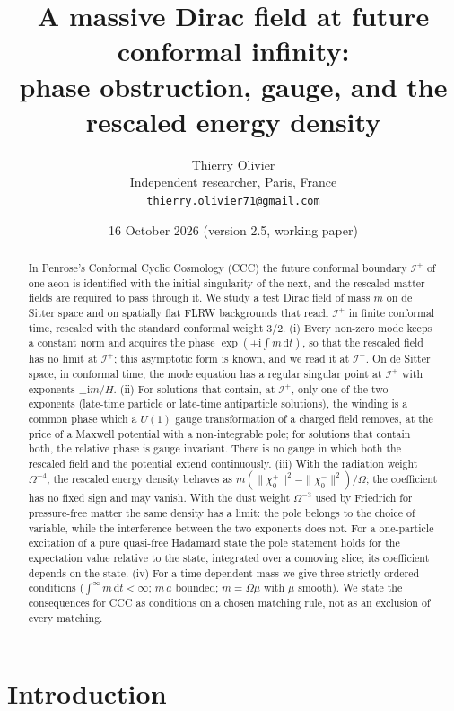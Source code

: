 \documentclass[11pt,a4paper]{article}
\title{\textbf{A massive Dirac field at future conformal infinity:\\ phase obstruction, gauge, and the rescaled energy density}}
\author{Thierry Olivier\\ \small Independent researcher, Paris, France\\ \small \texttt{thierry.olivier71@gmail.com}}
\date{16 October 2026 \quad (version 2.5, working paper)}
\theoremstyle{definition}
\newcommand{\scri}{\mathscr{I}^{+}}
\newcommand{\dd}{\mathrm{d}}
\newcommand{\ii}{\mathrm{i}}
\begin{document}
\maketitle

\begin{abstract}
In Penrose's Conformal Cyclic Cosmology (CCC) the future conformal boundary $\scri$ of one aeon is identified with the initial singularity of the next, and the rescaled matter fields are required to pass through it. We study a test Dirac field of mass $m$ on de Sitter space and on spatially flat FLRW backgrounds that reach $\scri$ in finite conformal time, rescaled with the standard conformal weight $3/2$. (i) Every non-zero mode keeps a constant norm and acquires the phase $\exp(\pm\ii\int m\,\dd t)$, so that the rescaled field has no limit at $\scri$; this asymptotic form is known, and we read it at $\scri$. On de Sitter space, in conformal time, the mode equation has a regular singular point at $\scri$ with exponents $\pm\ii m/H$. (ii) For solutions that contain, at $\scri$, only one of the two exponents (late-time particle or late-time antiparticle solutions), the winding is a common phase which a $U(1)$ gauge transformation of a charged field removes, at the price of a Maxwell potential with a non-integrable pole; for solutions that contain both, the relative phase is gauge invariant. There is no gauge in which both the rescaled field and the potential extend continuously. (iii) With the radiation weight $\Omega^{-4}$, the rescaled energy density behaves as $m(\|\chi_{0}^{+}\|^{2}-\|\chi_{0}^{-}\|^{2})/\Omega$; the coefficient has no fixed sign and may vanish. With the dust weight $\Omega^{-3}$ used by Friedrich for pressure-free matter the same density has a limit: the pole belongs to the choice of variable, while the interference between the two exponents does not. For a one-particle excitation of a pure quasi-free Hadamard state the pole statement holds for the expectation value relative to the state, integrated over a comoving slice; its coefficient depends on the state. (iv) For a time-dependent mass we give three strictly ordered conditions ($\int^{\infty}m\,\dd t<\infty$; $m\,a$ bounded; $m=\Omega\mu$ with $\mu$ smooth). We state the consequences for CCC as conditions on a chosen matching rule, not as an exclusion of every matching.
\end{abstract}

\section{Introduction}
\end{document}
